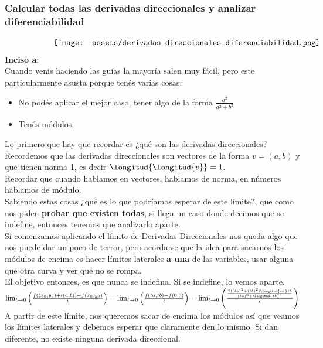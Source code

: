 \documentclass[10pt,a4paper]{article}
\begin{document}
\subsubsection{Calcular \textbf{todas las derivadas direccionales} y analizar diferenciabilidad}
\[\begin{minipage}[b]{0.7\textwidth}
    \texttt{[image: assets/derivadas\_direccionales\_diferenciabilidad.png]}
\end{minipage}\]
\textbf{Inciso a}: \\
Cuando venis haciendo las guías la mayoría salen muy fácil, pero este particularmente asusta porque tenés varias cosas: 
\begin{itemize}
    \item No podés aplicar el mejor caso, tener algo de la forma $\frac{a^{2}}{a^{2} + b^{2}}$
    \item Tenés módulos.
\end{itemize}
Lo primero que hay que recordar es ¿qué son las derivadas direccionales? \\
Recordemos que las derivadas direccionales son vectores de la forma $v = (a,b)$ y que tienen norma 1, es decir $\longitud{\longitud{v}} = 1$. \\
Recordar que cuando hablamos en vectores, hablamos de norma, en números hablamos de módulo. \\
Sabiendo estas cosas ¿qué es lo que podríamos esperar de este límite?, que como nos piden \textbf{probar que existen todas}, si llega un caso donde decimos que se indefine, entonces tenemos que analizarlo aparte. \\
Si comenzamos aplicando el límite de Derivadas Direccionales nos queda algo que nos puede dar un poco de terror, pero acordarse que la idea para sacarnos los módulos de encima es hacer límites laterales \textbf{a una} de las variables, usar alguna que otra curva y ver que no se rompa. \\
El objetivo entonces, es que nunca se indefina. Si se indefine, lo vemos aparte. \\
$\lim_{t \to 0} \left(\frac{f((x_{0}, y_{0}) + t(a, b)) - f(x_{0}, y_{0})}{t} \right) = \lim_{t \to 0} \left(\frac{f(ta, tb) - f(0, 0)}{t} \right)  = \lim_{t \to 0} \left(\frac{\frac{2((ta)^{2} + (tb)^{2}) \longitud{ta} tb}{(ta)^{6} + \longitud{tb}^{3}}}{t} \right) $ \\
A partir de este límite, nos queremos sacar de encima los módulos así que veamos los límites laterales y debemos esperar que claramente den lo mismo. Si dan diferente, no existe ninguna derivada direccional. \\
\end{document}
